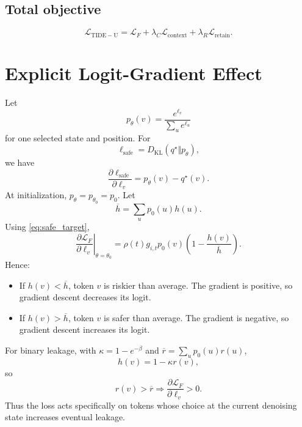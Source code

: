 \documentclass[10pt]{article}
\newcommand{\KL}{D_{\mathrm{KL}}}
\newcommand{\1}{\mathbb{I}}
\begin{document}
\subsection{Total objective}

\begin{equation}
\boxed{
\mathcal L_{\mathrm{TIDE-U}}
=
\mathcal L_F
+\lambda_C\mathcal L_{\mathrm{context}}
+\lambda_R\mathcal L_{\mathrm{retain}}.
}
\label{eq:total_loss}
\end{equation}

\section{Explicit Logit-Gradient Effect}

Let
\begin{equation}
p_\theta(v)=\frac{e^{\ell_v}}{\sum_u e^{\ell_u}}
\end{equation}
for one selected state and position. For
\begin{equation}
\ell_{\mathrm{safe}}=\KL(q^\star\Vert p_\theta),
\end{equation}
we have
\begin{equation}
\frac{\partial \ell_{\mathrm{safe}}}{\partial\ell_v}
=p_\theta(v)-q^\star(v).
\label{eq:basic_gradient}
\end{equation}
At initialization, $p_\theta=p_{\theta_0}=p_0$. Let
\begin{equation}
\overline h=\sum_u p_0(u)h(u).
\end{equation}
Using \cref{eq:safe_target},
\begin{equation}
\left.
\frac{\partial\mathcal L_F}{\partial\ell_v}
\right|_{\theta=\theta_0}
=
\rho(t)g_{i,t}p_0(v)
\left(1-\frac{h(v)}{\overline h}\right).
\label{eq:target_gradient}
\end{equation}
Hence:
\begin{itemize}[leftmargin=*]
    \item If $h(v)<\overline h$, token $v$ is riskier than average. The gradient is positive, so gradient descent decreases its logit.
    \item If $h(v)>\overline h$, token $v$ is safer than average. The gradient is negative, so gradient descent increases its logit.
\end{itemize}

For binary leakage, with $\kappa=1-e^{-\beta}$ and $\overline r=\sum_u p_0(u)r(u)$,
\begin{equation}
h(v)=1-\kappa r(v),
\end{equation}
so
\begin{equation}
r(v)>\overline r
\Longrightarrow
\frac{\partial\mathcal L_F}{\partial\ell_v}>0.
\end{equation}
Thus the loss acts specifically on tokens whose choice at the current denoising state increases eventual leakage.
\end{document}
